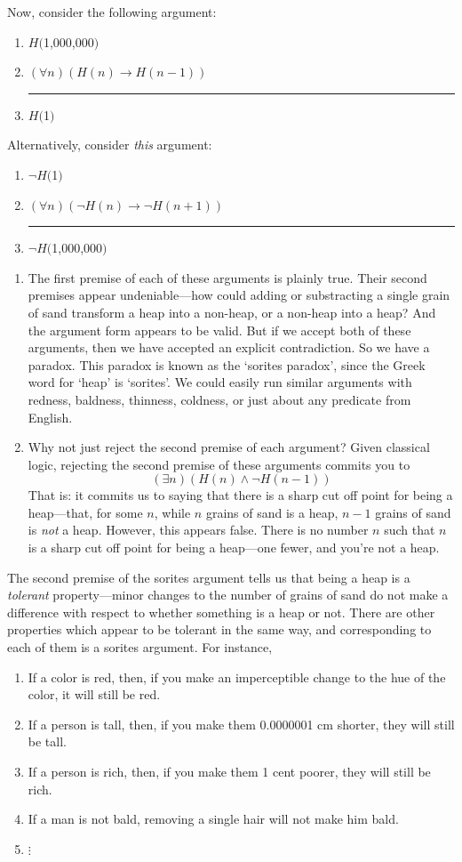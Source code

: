 \documentclass[landscape, two column, full page,reqno]{article}
\newcommand{\qe}{\begin{enumerate}[align=left,style=nextline,leftmargin=17pt,labelsep=5pt,font=\normalfont]}
\newcommand{\e}{\emph}
\newcommand{\fn}{\footnote}
\newcommand{\ze}{\end{enumerate}}
\newcommand{\p}{\item}
\newcommand{\thus}{

\vspace{5pt}
\hrule
}
\newcommand{\argu}[2]{\begin{center}\begin{minipage}{#1} \begin{enumerate}
	#2
\end{enumerate}
\end{minipage}  
\end{center}}
\begin{document}
\p Now, consider the following argument: %
		\argu{150pt}{
		\p[] $H($1,000,000$)$
		\p[] $(\forall n ) (H(n) \to H(n-1))$
		\thus
		\p[] $H($1$)$
		}
Alternatively, consider \e{this} argument:
		\argu{160pt}{
		\p[] $\neg H($1$)$
		\p[] $(\forall n ) (\neg H(n) \to \neg H(n+1))$
		\thus
		\p[] $\neg H($1,000,000$)$
		}
		\qe
		\p The first premise of each of these arguments is plainly true.  Their second premises appear undeniable---how could adding or substracting a single grain of sand transform a heap into a non-heap, or a non-heap into a heap?  And the argument form appears to be valid.  But if we accept both of these arguments, then we have accepted an explicit contradiction.  So we have a paradox.  This paradox is known as the `sorites paradox', since the Greek word for `heap' is `sorites'.  We could easily run similar arguments with redness, baldness, thinness, coldness, or just about any predicate from English.
		\p Why not just reject the second premise of each argument?  Given classical logic, rejecting the second premise of these arguments commits you to 
				\[
				(\exists n) (H(n) \wedge \neg H(n-1))
				\]
		That is: it commits us to saying that there is a sharp cut off point for being a heap---that, for some $n$, while $n$ grains of sand is a heap, $n-1$ grains of sand is \e{not} a heap.  However, this appears false.  There is no number $n$ such that $n$ is a sharp cut off point for being a heap---one fewer, and you're not a heap.
		\ze 
\p The second premise of the sorites argument tells us that being a heap is a \e{tolerant} property---minor changes to the number of grains of sand do not make a difference with respect to whether something is a heap or not.   There are other properties which appear to be tolerant in the same way, and corresponding to each of them is a sorites argument.  For instance,
	\qe
	\p If a color is red, then, if you make an imperceptible change to the hue of the color, it will still be red.
	\p If a person is tall, then, if you make them 0.0000001 cm shorter, they will still be tall.
	\p If a person is rich, then, if you make them 1 cent poorer, they will still be rich.
	\p If a man is not bald, removing a single hair will not make him bald.
	\p[] $\vdots$
	\ze 
\end{document}
